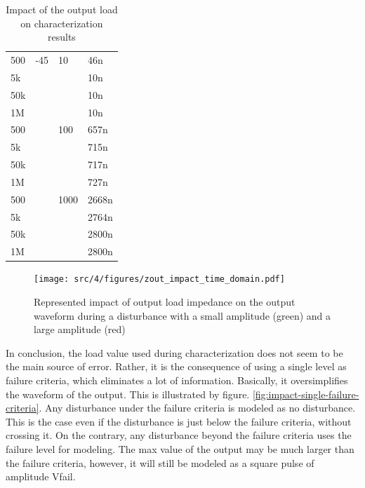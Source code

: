 \begin{table}[!p]
\begin{tabular}{llll}
500               & -45        & 10         & 46n    \\
5k                &            &            & 10n    \\
50k               &            &            & 10n    \\
1M                &            &            & 10n    \\
\rowcolor[gray]{.95}
500               &            & 100        & 657n    \\ \rowcolor[gray]{.95}
5k                &            &            & 715n    \\ \rowcolor[gray]{.95}
50k               &            &            & 717n    \\ \rowcolor[gray]{.95}
1M                &            &            & 727n    \\

500               &            & 1000       & 2668n    \\
5k                &            &            & 2764n   \\
50k               &            &            & 2800n    \\
1M                &            &            & 2800n    \\

\bottomrule
\end{tabular}
\caption{Impact of the output load on characterization results}
\label{tab:impact-load-on-cz}
\end{table}

\begin{figure}
  \centering
  \texttt{[image: src/4/figures/zout\_impact\_time\_domain.pdf]}
  \caption{Represented impact of output load impedance on the output waveform during a disturbance with a small amplitude (green) and a large amplitude (red)}
  \label{fig:impact-time-domain-load}
\end{figure}

In conclusion, the load value used during characterization does not seem to be the main source of error.
Rather, it is the consequence of using a single level as failure criteria, which eliminates a lot of information.
Basically, it oversimplifies the waveform of the output.
This is illustrated by figure. \ref{fig:impact-single-failure-criteria}.
Any disturbance under the failure criteria is modeled as no disturbance.
This is the case even if the disturbance is just below the failure criteria, without crossing it.
On the contrary, any disturbance beyond the failure criteria uses the failure level for modeling.
The max value of the output may be much larger than the failure criteria, however, it will still be modeled as a square pulse of amplitude Vfail.

